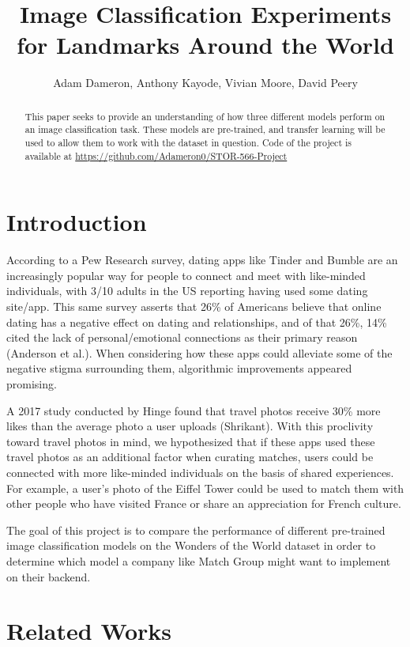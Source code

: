 \documentclass{article}
\title{Image Classification Experiments for Landmarks Around the World}
\author{Adam Dameron, Anthony Kayode, Vivian Moore, David Peery}
\begin{document}
	
	
\maketitle
	
\begin{abstract}
	This paper seeks to provide an understanding of how three different models perform on an image classification task. These models are pre-trained, and transfer learning will be used to allow them to work with the dataset in question. Code of the project is available at \url{https://github.com/Adameron0/STOR-566-Project}
\end{abstract}

\section{Introduction}

According to a Pew Research survey, dating apps like Tinder and Bumble are an increasingly popular way for people to connect and meet with like-minded individuals, with 3/10 adults in the US reporting having used some dating site/app. This same survey asserts that 26\% of Americans believe that online dating has a negative effect on dating and relationships, and of that 26\%, 14\% cited the lack of personal/emotional connections as their primary reason (Anderson et al.). When considering how these apps could alleviate some of the negative stigma surrounding them, algorithmic improvements appeared promising. 

A 2017 study conducted by Hinge found that travel photos receive 30\% more likes than the average photo a user uploads (Shrikant). With this proclivity toward travel photos in mind, we hypothesized that if these apps used these travel photos as an additional factor when curating matches, users could be connected with more like-minded individuals on the basis of shared experiences. For example, a user’s photo of the Eiffel Tower could be used to match them with other people who have visited France or share an appreciation for French culture.

The goal of this project is to compare the performance of different pre-trained image classification models on the Wonders of the World dataset in order to determine which model a company like Match Group might want to implement on their backend.


\section{Related Works}
\end{document}
